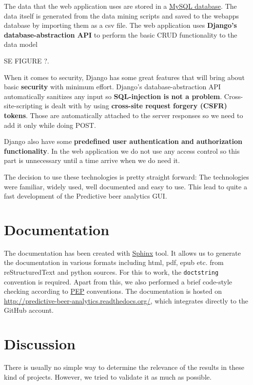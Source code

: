 \documentclass[10pt]{IEEEtran}
\begin{document}
The data that the web application uses are stored in a \href{http://www.mysql.com/}{MySQL database}.
The data itself is generated from the data mining scripts and saved to the webapps database by importing them as a csv file.
The web application uses \textbf{Django's database-abstraction API} to perform the basic CRUD functionality to the data model 

SE FIGURE ?.
 
When it comes to security, Django has some great features that will bring about basic \textbf{security} with minimum effort.
Django's database-abstraction API automatically sanitizes any input so \textbf{SQL-injection is not a problem}.
Cross-site-scripting is dealt with by using \textbf{cross-site request forgery (CSFR) tokens}. Those are automatically attached to the server responses so we need to add it only while doing POST.

Django also have some \textbf{predefined user authentication and authorization functionality}.
In the web application we do not use any access control so this part is unnecessary until a time arrive when we do need it.

The decision to use these technologies is pretty straight forward:
The technologies were familiar, widely used, well documented and easy to use.
This lead to quite a fast development of the Predictive beer analytics GUI.

\section{Documentation}
The documentation has been created with \href{http://sphinx-doc.org/}{Sphinx} tool. It allows us to generate the documentation in various formats including html, pdf, epub etc. from reStructuredText and python sources. For this to work, the \texttt{doctstring} convention is required. Apart from this, we also performed a brief code-style checking according to \href{https://www.python.org/dev/peps/}{PEP} conventions. The documentation is hosted on \href{http://predictive-beer-analytics.readthedocs.org/}{http://predictive-beer-analytics.readthedocs.org/}, which integrates directly to the GitHub account.



\section{Discussion}
There is usually no simple way to determine the relevance of the results in these kind of projects. However, we tried to validate it as much as possible. 
\end{document}

